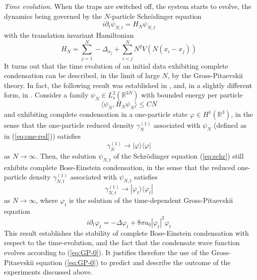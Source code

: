 \documentclass[11pt,a4paper]{article}
\newcommand{\bR}{{\mathbb R}}
\begin{document}
{\it Time evolution.} 
When the traps are switched off, the system starts to evolve, the dynamics being governed by the $N$-particle Schr\"odinger equation 
\begin{equation}\label{eq:schr} i \partial_t \psi_{N,t} = H_N \psi_{N,t} \end{equation}
with the translation invariant Hamiltonian
\begin{equation}\label{eq:ham-1} H_N = \sum_{j=1}^N -\Delta_{x_j} + \sum_{i<j}^N N^2 V(N (x_i - x_j)) \end{equation}
It turns out that the time evolution of an initial data exhibiting complete condensation can be described, in the limit of large $N$, by the Gross-Pitaevskii theory. In fact, the following result was established in 
\cite{ESY1,ESY2,ESY3,ESY4}, and, in a slightly different form, in \cite{P}. Consider a family $\psi_N \in L^2_s (\bR^{3N})$ with bounded energy per particle
\[ \langle \psi_N , H_N \psi_N \rangle \leq C N \]
and exhibiting complete condensation in a one-particle state $\varphi \in H^1 (\bR^3)$, in the sense that the one-particle reduced density $\gamma^{(1)}_N$ associated with $\psi_N$ (defined as in (\ref{eq:one-red})) satisfies
\[ \gamma_N^{(1)} \to |\varphi \rangle \langle \varphi| \] 
as $N \to \infty$. Then, the solution $\psi_{N,t}$ of the Schr\"odinger equation (\ref{eq:schr}) still exhibits complete Bose-Einstein condensation, in the sense that the reduced one-particle density $\gamma_{N,t}^{(1)}$ associated with $\psi_{N,t}$ satisfies 
\begin{equation}\label{eq:conv-GP} \gamma_{N,t}^{(1)} \to |\varphi_t \rangle \langle \varphi_t| \end{equation}
as $N \to \infty$, where $\varphi_t$ is the solution of the time-dependent Gross-Pitaevskii equation
\begin{equation}\label{eq:GP-0} i\partial_t \varphi_t = -\Delta \varphi_t + 8\pi a_0 |\varphi_t|^2 \varphi_t \end{equation}
This result establishes the stability of complete Bose-Einstein condensation with respect to the time-evolution, and the fact that the condensate wave function evolves according to (\ref{eq:GP-0}). It justifies therefore the use of the Gross-Pitaevskii equation (\ref{eq:GP-0}) to predict and describe the outcome of the experiments discussed above. 
\end{document}
